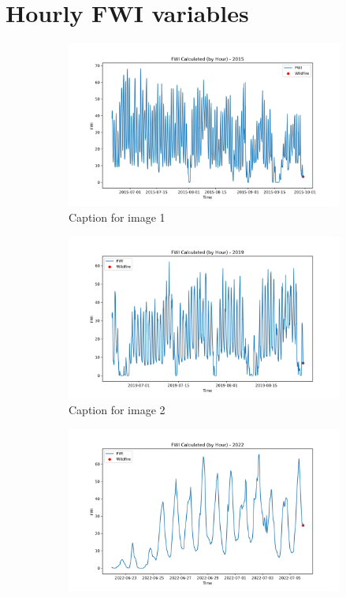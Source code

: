 \section{Hourly FWI variables}
\begin{figure}[h]
	\centering
	\caption{Caption for the whole figure}
	\begin{subfigure}{0.3\textwidth}
		\centering
		\includegraphics[width=\textwidth]{graphs/2015/byHour/2015CalcFWI12.png}
		\caption{Caption for image 1}
		\label{fig:img1}
	\end{subfigure}
	\hfill
	\begin{subfigure}{0.3\textwidth}
		\centering
		\includegraphics[width=\textwidth]{graphs/2019/byHour/2019CalcFWI12.png}
		\caption{Caption for image 2}
		\label{fig:img2}
	\end{subfigure}
	\hfill
	\begin{subfigure}{0.3\textwidth}
		\centering
		\includegraphics[width=\textwidth]{graphs/2022/2022CalcFWI12.png}

\end{subfigure}
\end{figure}
